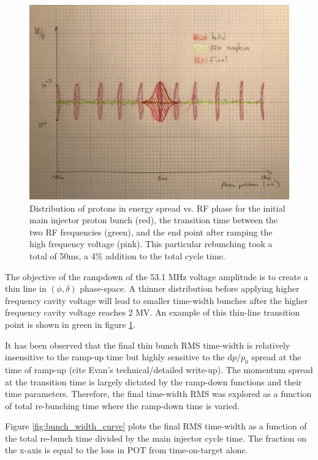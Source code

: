 \begin{figure}[t]
	\begin{center}
        \includegraphics[width=0.60\linewidth]{Figures/draft_bunch_distributions.JPG}
	\end{center}
	\caption{Distribution of protons in energy spread vs. RF phase
          for the initial main injector proton bunch (red), the
          transition time between the two RF frequencies (green), and
          the end point after ramping the high frequency voltage
          (pink). This particular rebunching took a total of 50ms, a
          4\% addition to the total cycle time.}
		\label{fig:bunch_distributions}
\end{figure}

The objective of the rampdown of the 53.1 MHz voltage amplitude is to
create a thin line in $(\phi, \delta)$ phase-space. A thinner
distribution before applying higher frequency cavity voltage will lead
to smaller time-width bunches after the higher frequency cavity
voltage reaches 2 MV. An example of this thin-line transition point is
shown in green in figure \ref{fig:bunch_distributions}.

It has been observed that the final thin bunch RMS time-width is
relatively insensitive to the ramp-up time but highly sensitive to the
$\mathrm{d}p/p_0$ spread at the time of ramp-up (cite Evan's
technical/detailed write-up). The momentum spread at the transition
time is largely dictated by the ramp-down functions and their time
parameters. Therefore, the final time-width RMS was explored as a
function of total re-bunching time where the ramp-down time is varied.

Figure \ref{fig:bunch_width_curve} plots the final RMS time-width as a
function of the total re-bunch time divided by the main injector cycle
time. The fraction on the x-axis is equal to the loss in POT from
time-on-target alone.

